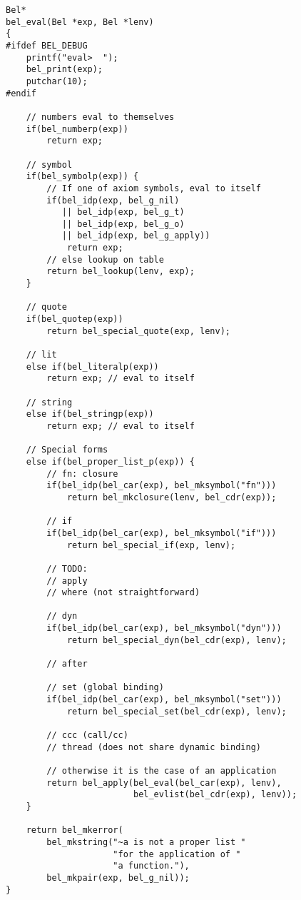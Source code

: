 \documentclass[openright,a4paper,twoside,12pt]{memoir}
\begin{document}
\begin{verbatim}
Bel*
bel_eval(Bel *exp, Bel *lenv)
{
#ifdef BEL_DEBUG
    printf("eval>  ");
    bel_print(exp);
    putchar(10);
#endif

    // numbers eval to themselves
    if(bel_numberp(exp))
        return exp;
    
    // symbol
    if(bel_symbolp(exp)) {
        // If one of axiom symbols, eval to itself
        if(bel_idp(exp, bel_g_nil)
           || bel_idp(exp, bel_g_t)
           || bel_idp(exp, bel_g_o)
           || bel_idp(exp, bel_g_apply))
            return exp;
        // else lookup on table
        return bel_lookup(lenv, exp);
    }

    // quote
    if(bel_quotep(exp))
        return bel_special_quote(exp, lenv);
    
    // lit
    else if(bel_literalp(exp))
        return exp; // eval to itself

    // string
    else if(bel_stringp(exp))
        return exp; // eval to itself

    // Special forms
    else if(bel_proper_list_p(exp)) {
        // fn: closure
        if(bel_idp(bel_car(exp), bel_mksymbol("fn")))
            return bel_mkclosure(lenv, bel_cdr(exp));
    
        // if
        if(bel_idp(bel_car(exp), bel_mksymbol("if")))
            return bel_special_if(exp, lenv);

        // TODO:
        // apply
        // where (not straightforward)
        
        // dyn
        if(bel_idp(bel_car(exp), bel_mksymbol("dyn")))
            return bel_special_dyn(bel_cdr(exp), lenv);
        
        // after
        
        // set (global binding)
        if(bel_idp(bel_car(exp), bel_mksymbol("set")))
            return bel_special_set(bel_cdr(exp), lenv);
        
        // ccc (call/cc)
        // thread (does not share dynamic binding)

        // otherwise it is the case of an application
        return bel_apply(bel_eval(bel_car(exp), lenv),
                         bel_evlist(bel_cdr(exp), lenv));
    }

    return bel_mkerror(
        bel_mkstring("~a is not a proper list "
                     "for the application of "
                     "a function."),
        bel_mkpair(exp, bel_g_nil));
}
\end{verbatim}
\end{document}
